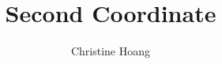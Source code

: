 \documentclass{article}
\title{Second Coordinate}
\author{Christine Hoang}
\begin{document}
\maketitle

\section{}
\end{document}
